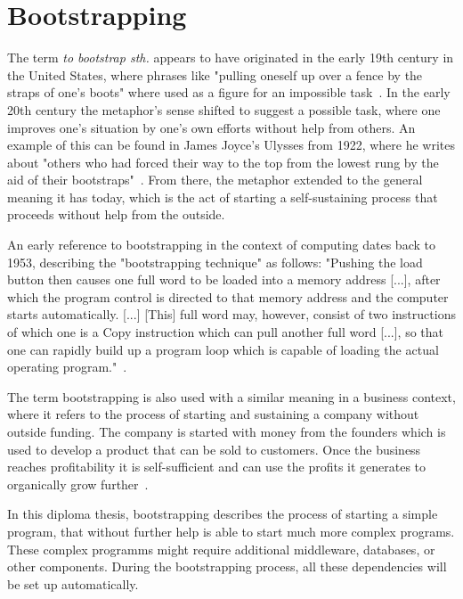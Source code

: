 \section{Bootstrapping}

The term \textit{to bootstrap sth.} appears to have originated in the early 19th century in the United States, where phrases like "pulling oneself up over a fence by the straps of one's boots" where used as a figure for an impossible task~\autocite{bootstrap:history}.
In the early 20th century the metaphor's sense shifted to suggest a possible task, where one improves one's situation by one's own efforts without help from others.
An example of this can be found in James Joyce's Ulysses from 1922, where he writes about "others who had forced their way to the top from the lowest rung by the aid of their bootstraps"~\autocite{bootstrap:ulysses}.
From there, the metaphor extended to the general meaning it has today, which is the act of starting a self-sustaining process that proceeds without help from the outside.

An early reference to bootstrapping in the context of computing dates back to 1953, describing the "bootstrapping technique" as follows: "Pushing the load button then causes one full word to be loaded into a memory address [...], after which the program control is directed to that memory address and the computer starts automatically. [...] [This] full word may, however, consist of two instructions of which one is a Copy instruction which can pull another full word [...], so that one can rapidly build up a program loop which is capable of loading the actual operating program."~\autocite[p.~1273]{bootstrap:early}.

The term bootstrapping is also used with a similar meaning in a business context, where it refers to the process of starting and sustaining a company without outside funding.
The company is started with money from the founders which is used to develop a product that can be sold to customers.
Once the business reaches profitability it is self-sufficient and can use the profits it generates to organically grow further~\autocite{bootstrap:business}.

In this diploma thesis, bootstrapping describes the process of starting a simple program, that without further help is able to start much more complex programs.
These complex programms might require additional middleware, databases, or other components.
During the bootstrapping process, all these dependencies will be set up automatically.
